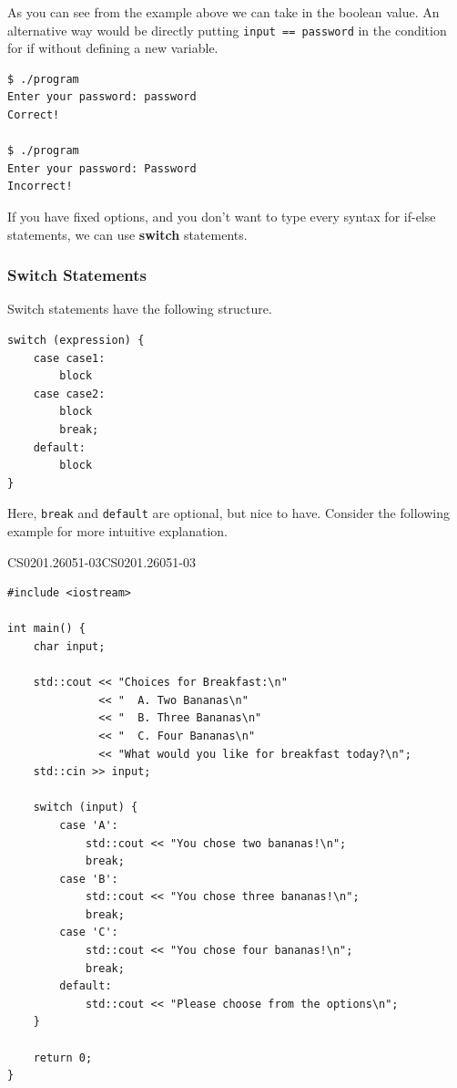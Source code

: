 \documentclass[../../../main.tex]{subfiles}
\begin{document}
As you can see from the example above we can take in the boolean
value. An alternative way would be directly putting
\verb|input == password| in the condition for if without defining
a new variable.

\begin{outputbox}
\begin{lstlisting}[style=basic]
$ ./program
Enter your password: password
Correct!

$ ./program
Enter your password: Password
Incorrect!
\end{lstlisting}
\end{outputbox}

If you have fixed options, and you don't want to type every
syntax for if-else statements, we can use \textbf{switch}
statements.

\subsubsection{Switch Statements}

Switch statements have the following structure.

\begin{basicbox}
\begin{lstlisting}[style=basic]
switch (expression) {
    case case1:
        block
    case case2:
        block
        break;
    default:
        block
}
\end{lstlisting}
\end{basicbox}

Here, \verb|break| and \verb|default| are optional, but nice to
have. Consider the following example for more intuitive explanation.

\begin{cppbox}{CS0201.26051-03}{CS0201.26051-03}
\begin{lstlisting}[style=cppstyle]
#include <iostream>

int main() {
    char input;

    std::cout << "Choices for Breakfast:\n"
              << "  A. Two Bananas\n"
              << "  B. Three Bananas\n"
              << "  C. Four Bananas\n"
              << "What would you like for breakfast today?\n";
    std::cin >> input;

    switch (input) {
        case 'A':
            std::cout << "You chose two bananas!\n";
            break;
        case 'B':
            std::cout << "You chose three bananas!\n";
            break;
        case 'C':
            std::cout << "You chose four bananas!\n";
            break;
        default:
            std::cout << "Please choose from the options\n";
    }

    return 0;
}
\end{lstlisting}
\end{cppbox}
\end{document}
